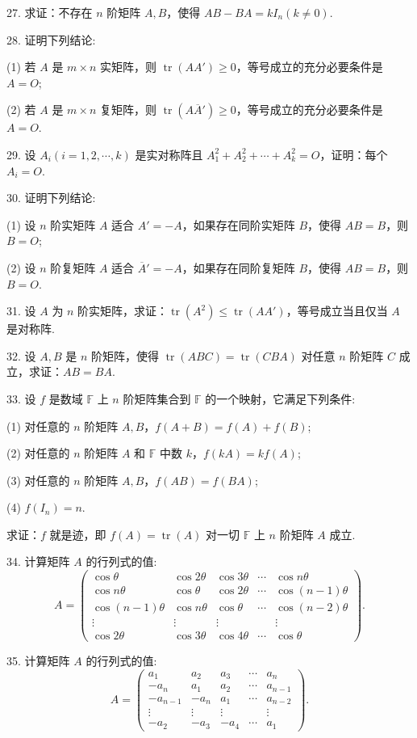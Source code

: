 \documentclass[UTF8,12pt,a4paper,fontset=fandol]{ctexart}
\begin{document}
27. 求证：不存在 $n$ 阶矩阵 $A,B$，使得 $AB-BA=kI_n(k\neq 0)$.

28. 证明下列结论:

(1) 若 $A$ 是 $m\times n$ 实矩阵，则 $\operatorname{tr}(AA')\geq 0$，等号成立的充分必要条件是 $A=O$;

(2) 若 $A$ 是 $m\times n$ 复矩阵，则 $\operatorname{tr}(A\overline{A}')\geq 0$，等号成立的充分必要条件是 $A=O$.

29. 设 $A_i(i=1,2,\cdots,k)$ 是实对称阵且 $A_1^2+A_2^2+\cdots+A_k^2=O$，证明：每个 $A_i=O$.

30. 证明下列结论:

(1) 设 $n$ 阶实矩阵 $A$ 适合 $A'=-A$，如果存在同阶实矩阵 $B$，使得 $AB=B$，则 $B=O$;

(2) 设 $n$ 阶复矩阵 $A$ 适合 $\overline{A}'=-A$，如果存在同阶复矩阵 $B$，使得 $AB=B$，则 $B=O$.

31. 设 $A$ 为 $n$ 阶实矩阵，求证：$\operatorname{tr}(A^2)\leq \operatorname{tr}(AA')$，等号成立当且仅当 $A$ 是对称阵.

32. 设 $A,B$ 是 $n$ 阶矩阵，使得 $\operatorname{tr}(ABC)=\operatorname{tr}(CBA)$ 对任意 $n$ 阶矩阵 $C$ 成立，求证：$AB=BA$.

33. 设 $f$ 是数域 $\mathbb{F}$ 上 $n$ 阶矩阵集合到 $\mathbb{F}$ 的一个映射，它满足下列条件:

(1) 对任意的 $n$ 阶矩阵 $A,B$，$f(A+B)=f(A)+f(B)$;

(2) 对任意的 $n$ 阶矩阵 $A$ 和 $\mathbb{F}$ 中数 $k$，$f(kA)=kf(A)$;

(3) 对任意的 $n$ 阶矩阵 $A,B$，$f(AB)=f(BA)$;

(4) $f(I_n)=n$.

求证：$f$ 就是迹，即 $f(A)=\operatorname{tr}(A)$ 对一切 $\mathbb{F}$ 上 $n$ 阶矩阵 $A$ 成立.

34. 计算矩阵 $A$ 的行列式的值:
\[
A=\left(\begin{array}{ccccc}
\cos\theta & \cos2\theta & \cos3\theta & \cdots & \cos n\theta\\
\cos n\theta & \cos\theta & \cos2\theta & \cdots & \cos(n-1)\theta\\
\cos(n-1)\theta & \cos n\theta & \cos\theta & \cdots & \cos(n-2)\theta\\
\vdots & \vdots & \vdots & & \vdots\\
\cos2\theta & \cos3\theta & \cos4\theta & \cdots & \cos\theta
\end{array}\right).
\]

35. 计算矩阵 $A$ 的行列式的值:
\[
A=\left(\begin{array}{ccccc}
a_1 & a_2 & a_3 & \cdots & a_n\\
-a_n & a_1 & a_2 & \cdots & a_{n-1}\\
-a_{n-1} & -a_n & a_1 & \cdots & a_{n-2}\\
\vdots & \vdots & \vdots & & \vdots\\
-a_2 & -a_3 & -a_4 & \cdots & a_1
\end{array}\right).
\]
\end{document}
